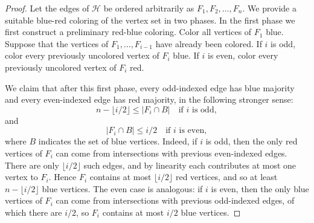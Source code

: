 \documentclass[10pt]{article}
\theoremstyle{definition}
\begin{document}
	\begin{proof} Let the edges of $\mathcal H$ be ordered arbitrarily as
		$F_1,F_2,\dots,F_n$. We provide a suitable blue-red coloring of the vertex set in two phases.
		In the first phase we first construct a preliminary red-blue coloring. Color all vertices of
		$F_1$ blue. Suppose that the vertices of  $F_1,\dots,F_{i-1}$ have already been colored.
		If $i$ is odd, color every previously uncolored vertex of $F_i$ blue. If
		$i$ is even, color every previously uncolored vertex of $F_i$ red.
		
		We claim that after this first phase, every odd-indexed edge has blue
		majority and every even-indexed edge has red majority, in the following
		stronger sense:
		\[
		\ensuremath{n-\lfloor i/2\rfloor\le |F_i\cap B|}
		\quad\text{if } i \text{ is odd},
		\]
		and
		\[
		|F_i\cap B|\le i/2
		\quad\text{if } i \text{ is even},
		\] where $B$ indicates the set of blue vertices.
		Indeed, if $i$ is odd, then the only red vertices of $F_i$ can come from
		intersections with previous even-indexed edges. There are only
		$\lfloor i/2\rfloor$ such edges, and by linearity each contributes at most
		one vertex to $F_i$. Hence $F_i$ contains at most $\lfloor i/2\rfloor$ red
		vertices, and so at least $n-\lfloor i/2\rfloor$ blue vertices. The even
		case is analogous: if $i$ is even, then the only blue vertices of $F_i$
		can come from intersections with previous odd-indexed edges, of which
		there are $i/2$, so $F_i$ contains at most $i/2$ blue vertices.
		
		
		

\end{proof}
\end{document}
